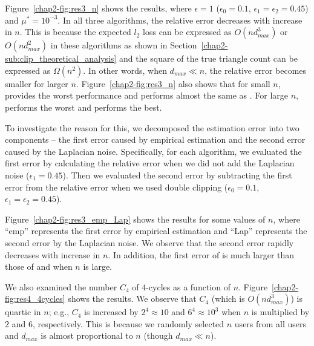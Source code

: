 Figure~\ref{chap2-fig:res3_n} shows the results, where $\epsilon=1$ ($\epsilon_0=0.1$, $\epsilon_1 = \epsilon_2 = 0.45$) and $\mu^* = 10^{-3}$. 
In all 
three algorithms, the relative error decreases with increase in $n$.
This is because the expected $l_2$ loss can be expressed as 
$O(n d_{max}^3)$ or $O(n d_{max}^2)$ 
in these algorithms as shown in Section~\ref{chap2-sub:clip_theoretical_analysis} and the square of the true triangle count can be expressed as $\Omega(n^2)$.
In other words, when $d_{max} \ll n$, the relative error becomes smaller for larger $n$. 
Figure~\ref{chap2-fig:res3_n} also shows that for small $n$, \AlgThree{} provides the worst performance and 
\AlgTwo{} performs almost the same as \AlgOne{}. 
For large $n$, 
\AlgOne{} performs the worst and 
\AlgTwo{} performs the best. 


To investigate the reason for this, we decomposed the estimation error into two components -- 
the first error caused by empirical estimation and the second error caused by the Laplacian noise. 
Specifically, for each algorithm, 
we evaluated the first error by calculating the relative error when we did not add the Laplacian noise ($\epsilon_1 = 0.45$). 
Then we evaluated the second error by subtracting the first error from the relative error when we used double clipping ($\epsilon_0=0.1$, $\epsilon_1 = \epsilon_2 = 0.45$). 

Figure~\ref{chap2-fig:res3_emp_Lap} shows the results for some values of $n$, where ``emp'' represents the first error by empirical estimation and ``Lap'' represents the second error by the Laplacian noise. 
We observe that the second error 
rapidly decreases with increase in $n$. 
In addition, 
the first error of \AlgOne{} is much larger than those of \AlgTwo{} and \AlgThree{} when $n$ is large. 

We also examined 
the number $C_4$ of $4$-cycles as a function of $n$. Figure~\ref{chap2-fig:res4_4cycles} shows the results. 
We observe that $C_4$ (which is $O(n d_{max}^3)$) is quartic in $n$; e.g., $C_4$ is increased by $2^4 \approx 10$ and $6^4 \approx 10^3$ when $n$ is multiplied by $2$ and $6$, respectively. 
This is because we randomly selected $n$ users from all users and $d_{max}$ is almost proportional to $n$ (though $d_{max} \ll n$). 

